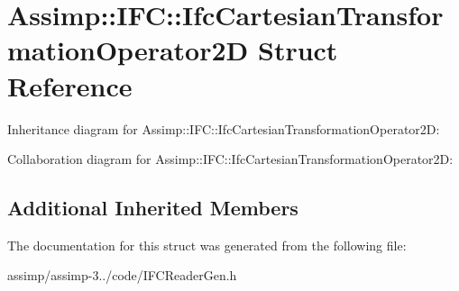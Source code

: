 \hypertarget{struct_assimp_1_1_i_f_c_1_1_ifc_cartesian_transformation_operator2_d}{\section{Assimp\+:\+:I\+F\+C\+:\+:Ifc\+Cartesian\+Transformation\+Operator2\+D Struct Reference}
\label{struct_assimp_1_1_i_f_c_1_1_ifc_cartesian_transformation_operator2_d}
}


Inheritance diagram for Assimp\+:\+:I\+F\+C\+:\+:Ifc\+Cartesian\+Transformation\+Operator2\+D\+:


Collaboration diagram for Assimp\+:\+:I\+F\+C\+:\+:Ifc\+Cartesian\+Transformation\+Operator2\+D\+:
\subsection*{Additional Inherited Members}


The documentation for this struct was generated from the following file\+:\begin{DoxyCompactItemize}
\item 
assimp/assimp-\/3../code/I\+F\+C\+Reader\+Gen.\+h\end{DoxyCompactItemize}
